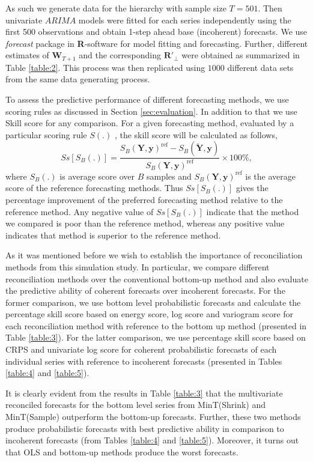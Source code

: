 \documentclass[a4paper, 11pt]{article}
\begin{document}
As such we generate data for the hierarchy with sample size $T=501$. Then univariate $ARIMA$ models were fitted for each series independently using the first 500 observations and obtain 1-step ahead base (incoherent) forecasts. We use \textit{forecast} package in \textbf{R}-software \citet{hyndman2017forecasting} for model fitting and forecasting. Further, different estimates of $\bm{W}_{T+1}$ and the corresponding $\bm{R}'_\bot$ were obtained as summarized in Table \ref{table:2}. This process was then replicated using $1000$ different data sets from the same data generating process.

To assess the predictive performance of different forecasting methods, we use scoring rules as discussed in Section \ref{sec:evaluation}. In addition to that we use Skill score \citep{Gneiting2007} for any comparison. For a given forecasting method, evaluated by a particular scoring rule $S(.)$ , the skill score will be calculated as follows,
\begin{equation}
Ss[S_B(.)] = \frac{S_B(\bm{Y},\bm{y})^{\text{ref}} - S_B(\bm{\breve{Y}},\bm{y})}{S_B(\bm{Y},\bm{y})^{\text{ref}}}\times 100\%,
\end{equation}
where $S_B(.)$ is average score over $B$ samples and $S_B(\bm{Y},\bm{y})^{\text{ref}}$ is the average score of the reference forecasting methods. Thus $Ss[S_B(.)]$ gives the percentage improvement of the preferred forecasting method relative to the reference method. Any negative value of $Ss[S_B(.)]$ indicate that the method we compared is poor than the reference method, whereas any positive value indicates that method is superior to the reference method.

As it was mentioned before we wish to establish the importance of reconciliation methods from this simulation study. In particular, we compare different reconciliation methods over the conventional bottom-up method and also evaluate the predictive ability of coherent forecasts over incoherent forecasts. For the former comparison, we use bottom level probabilistic forecasts and calculate the percentage skill score based on energy score, log score and variogram score for each reconciliation method with reference to the bottom up method (presented in Table \ref{table:3}). For the latter comparison, we use percentage skill score based on CRPS and univariate log score for coherent probabilistic forecasts of each individual series with reference to incoherent forecasts (presented in Tables \ref{table:4} and \ref{table:5}).

It is clearly evident from the results in Table \ref{table:3} that the multivariate reconciled forecasts for the bottom level series from MinT(Shrink) and MinT(Sample) outperform the bottom-up forecasts. Further, these two methods produce probabilistic forecasts with best predictive ability in comparison to incoherent forecasts (from Tables \ref{table:4} and \ref{table:5}). Moreover, it turns out that OLS and bottom-up methods produce the worst forecasts.
\end{document}

